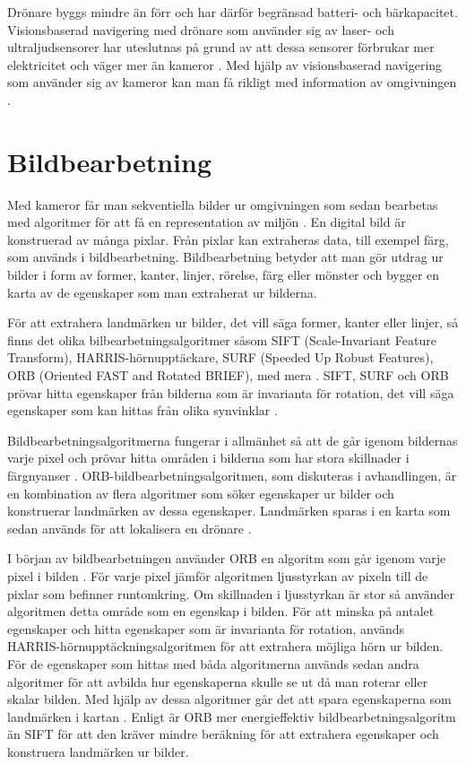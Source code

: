 Drönare byggs mindre än förr och har därför begränsad batteri- och bärkapacitet. Visionsbaserad navigering med drönare som använder sig av laser- och ultraljudsensorer har uteslutnas på grund av att dessa sensorer förbrukar mer elektricitet och väger mer än kameror \citep{6385934}. Med hjälp av visionsbaserad navigering som använder sig av kameror kan man få rikligt med information av omgivningen \citep{geospatial}.

\section{Bildbearbetning}

Med kameror får man sekventiella bilder ur omgivningen som sedan bearbetas med algoritmer för att få en representation av miljön \citep{982903}. En digital bild är konstruerad av många pixlar. Från pixlar kan extraheras data, till exempel färg, som används i bildbearbetning. Bildbearbetning betyder att man gör utdrag ur bilder i form av former, kanter, linjer, rörelse, färg eller mönster och bygger en karta av de egenskaper som man extraherat ur bilderna. 

För att extrahera landmärken ur bilder, det vill säga former, kanter eller linjer, så finns det olika bilbearbetningsalgoritmer såsom SIFT (Scale-Invariant Feature Transform), HARRIS-hörnupptäckare, SURF (Speeded Up Robust Features), ORB (Oriented FAST and Rotated BRIEF), med mera \citep{orb, slamproblem, mapbuildingsift}. SIFT, SURF och ORB prövar hitta egenskaper från bilderna som är invarianta för rotation, det vill säga egenskaper som kan hittas från olika synvinklar \citep{orb}. 

Bildbearbetningsalgoritmerna fungerar i allmänhet så att de går igenom bildernas varje pixel och prövar hitta områden i bilderna som har stora skillnader i färgnyanser \citep{orb}. ORB-bildbearbetningsalgoritmen, som diskuteras i avhandlingen, är en kombination av flera algoritmer som söker egenskaper ur bilder och konstruerar landmärken av dessa egenskaper. Landmärken sparas i en karta som sedan används för att lokalisera en drönare \citep{geospatial}.

I början av bildbearbetningen använder ORB en algoritm som går igenom varje pixel i bilden \citep{orb}. För varje pixel jämför algoritmen ljusstyrkan av pixeln till de pixlar som befinner runtomkring. Om skillnaden i ljusstyrkan är stor så använder algoritmen detta område som en egenskap i bilden. För att minska på antalet egenskaper och hitta egenskaper som är invarianta för rotation, används HARRIS-hörnupptäckningsalgoritmen för att extrahera möjliga hörn ur bilden. För de egenskaper som hittas med båda algoritmerna används sedan andra algoritmer för att avbilda hur egenskaperna skulle se ut då man roterar eller skalar bilden. Med hjälp av dessa algoritmer går det att spara egenskaperna som landmärken i kartan \citep{orb}. Enligt \cite{orb} är ORB mer energieffektiv bildbearbetningsalgoritm än SIFT för att den kräver mindre beräkning för att extrahera egenskaper och konstruera landmärken ur bilder.

